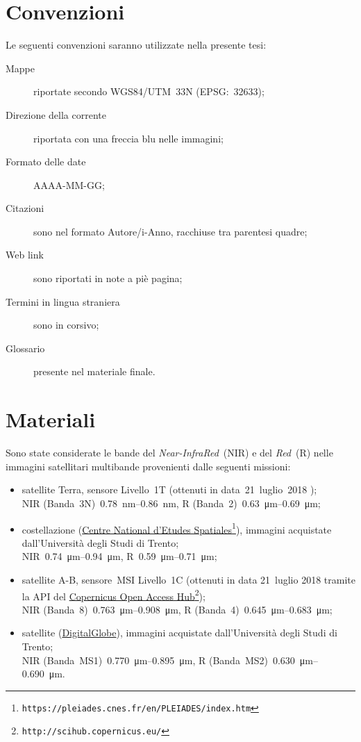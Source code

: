 \section{Convenzioni}
Le seguenti convenzioni saranno utilizzate nella presente tesi:
\begin{description}
	\item[Mappe] riportate secondo WGS84/UTM~33N (EPSG:~32633);
	\item[Direzione della corrente] riportata con una freccia blu nelle immagini;
	\item[Formato delle date] AAAA-MM-GG;
	\item[Citazioni] sono nel formato Autore/i-Anno, racchiuse tra parentesi quadre;
	\item[Web link] sono riportati in note a piè pagina;
	\item[Termini in lingua straniera] sono in corsivo;
	\item[Glossario] presente nel materiale finale.
\end{description}



\section{Materiali}
Sono state considerate le bande del \emph{Near-InfraRed}~(NIR) e del \emph{Red}~(R) nelle immagini satellitari multibande provenienti dalle seguenti missioni:
%
\begin{itemize}
	\item satellite Terra, sensore \AST{} Livello~1T (ottenuti in data~21~luglio~2018 );  
		\\
		NIR (Banda~3N)~\SIrange[range-phrase={-}]{0.78}{0.86}{\nano\m}, R (Banda~2)~\SIrange[range-phrase={-}]{0.63}{0.69}{\micro\m};
	\item costellazione \Pl{} (\href{https://pleiades.cnes.fr/en/PLEIADES/index.htm}{Centre National d'Etudes Spatiales}\footnote{\texttt{https://pleiades.cnes.fr/en/PLEIADES/index.htm}}), immagini acquistate dall'Università degli Studi di Trento; 
		\\
		NIR~\SIrange[range-phrase={-}]{0.74}{0.94}{\micro\m}, R~\SIrange[range-phrase={-}]{0.59}{0.71}{\micro\m};
	\item satellite \Se{}A-B, sensore~MSI Livello~1C (ottenuti in data 21~luglio 2018 tramite la API del \href{http://scihub.copernicus.eu/}{Copernicus Open Access Hub}\footnote{\texttt{http://scihub.copernicus.eu/}});
		\\
		NIR (Banda~8)~\SIrange[range-phrase={-}]{0.763}{0.908}{\micro\m}, R (Banda~4)~\SIrange[range-phrase={-}]{0.645}{0.683}{\micro\m};
	\item satellite \WV{}  (\href{https://dg-cms-uploads-production.s3.amazonaws.com/uploads/document/file/98/WorldView2-DS-WV2-rev2.pdf}{DigitalGlobe}), immagini acquistate dall'Università degli Studi di Trento;
		\\
		NIR (Banda~MS1)~\SIrange[range-phrase={-}]{0.770}{0.895}{\micro\m}, R (Banda~MS2)~\SIrange[range-phrase={-}]{0.630}{0.690}{\micro\m}.
\end{itemize}
%

